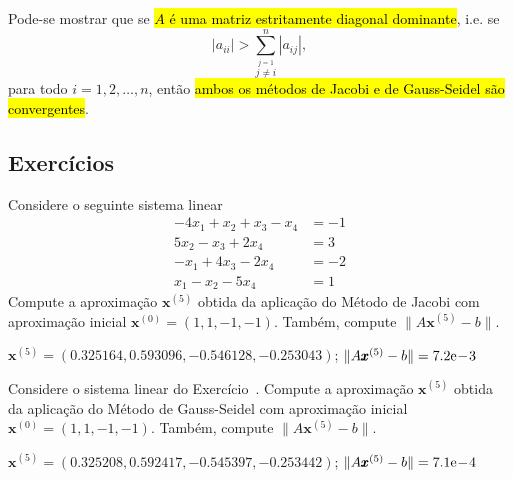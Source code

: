 \begin{obs}{}
  Pode-se mostrar que se \hl{$A$ é uma matriz estritamente diagonal dominante}, i.e. se
  \begin{equation}
    |a_{ii}| > \sum_{\overset{j=1}{j\neq i}}^n |a_{ij}|,
  \end{equation}
para todo $i = 1, 2, \ldots, n$, então \hl{ambos os métodos de Jacobi e de Gauss-Seidel são convergentes}.
\end{obs}

\subsection{Exercícios}

\begin{exer}\label{cap_sislin_sec_jgs:exer:jacobi}
  Considere o seguinte sistema linear
  \begin{align}
    -4x_1 + x_2 + x_3 - x_4 &= -1\\
    5x_2 -x_3 + 2x_4 &= 3\\
    -x_1 + 4x_3 - 2x_4 &= -2\\
    x_1 -x_2 -5x_4 &= 1
  \end{align}
  Compute a aproximação $\pmb{x}^{(5)}$ obtida da aplicação do Método de Jacobi com aproximação inicial $\pmb{x}^{(0)} = (1,  1, -1, -1)$. Também, compute $\|A\pmb{x}^{(5)} - b\|$.
\end{exer}
\begin{resp}
  $\pmb{x}^{(5)} = (0.325164, 0.593096, -0.546128, -0.253043)$; $\|A\pmb{x}^{(5)}-b\| = 7.2\mathrm{e}\!-\!3$
\end{resp}

\begin{exer}
  Considere o sistema linear do Exercício~\label{cap_sislin_sec_jgs:exer:jacobi}. Compute a aproximação $\pmb{x}^{(5)}$ obtida da aplicação do Método de Gauss-Seidel com aproximação inicial $\pmb{x}^{(0)} = (1,  1, -1, -1)$. Também, compute $\|A\pmb{x}^{(5)} - b\|$.
\end{exer}
\begin{resp}
  $\pmb{x}^{(5)} = (0.325208, 0.592417, -0.545397, -0.253442)$; $\|A\pmb{x}^{(5)}-b\| = 7.1\mathrm{e}\!-\!4$
\end{resp}


